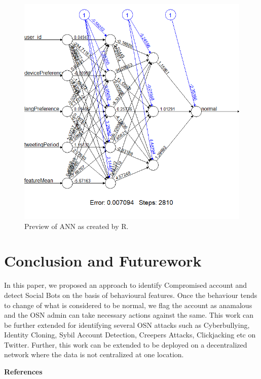 \documentclass[conference]{IEEEtran}
\begin{document}
\begin{figure}[h!]
  \includegraphics[scale=0.4]{sample_ann}
  \caption{Preview of ANN as created by R.}
\end{figure}


\newpage
\section{Conclusion and Futurework}

In this paper, we proposed an approach to identify Compromised account and detect Social Bots on the basis of behavioural features. Once the behaviour tends to change of what is considered to be normal, we flag the account as anamalous and the OSN admin can take necessary actions against the same. This work can be further extended for identifying several OSN attacks such as Cyberbullying, Identity Cloning, Sybil Account Detection, Creepers Attacks, Clickjacking etc on Twitter. Further, this work can be extended to be deployed on a decentralized network where the data is not centralized at one location.

\begin{center}
\textbf{References}
\end{center}
\end{document}
